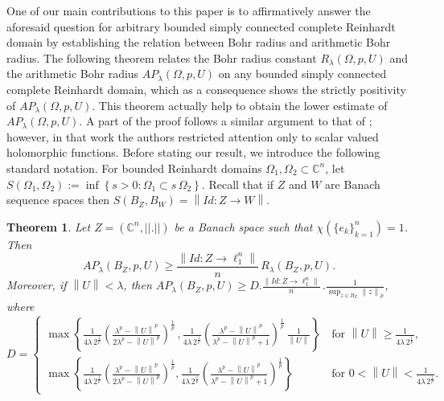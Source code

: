 \documentclass[a4paper,11pt, reqno]{amsart}
\newtheorem{thm}{Theorem}[section]
\theoremstyle{definition}
\newtheorem{qsn}{Question} [section]
\newcommand{\norm}[1]{\left\lVert#1\right\rVert}
\begin{document}
	One of our main contributions to this paper is to affirmatively answer the aforesaid question for arbitrary bounded simply connected complete Reinhardt domain by establishing the relation between Bohr radius and arithmetic Bohr radius. The following theorem relates the Bohr radius constant $R_{\lambda}(\Omega, p,U)$ and the arithmetic Bohr radius $AP_{\lambda}(\Omega, p,U)$ on any bounded  simply connected complete Reinhardt domain, which as a consequence shows the strictly positivity of $AP_{\lambda}(\Omega, p,U)$. This theorem actually help to obtain the lower estimate of $AP_{\lambda}(\Omega, p,U)$. A part of the proof follows a similar argument to that of \cite[Lemma 4.3]{defant-2012}; however, in that work the authors restricted attention only to scalar valued holomorphic functions.
	Before stating our result, we introduce the following standard notation. For bounded Reinhardt domains $\Omega_{1}, \Omega_{2}\subset \mathbb{C}^n$, let $S(\Omega_1, \Omega_{2}):= \inf \left\{s>0 : \Omega_{1} \subset s \, \Omega_{2}\right\}$. Recall that if $Z$ and $W$ are Banach sequence spaces then $S(B_{Z},B_{W})=\norm{Id:Z \rightarrow W}$.
	\begin{thm} \label{thm-1.8-atm}
			Let $Z=(\mathbb{C}^n, ||.||)$ be a Banach space such that $\chi(\{e_k\}^n_{k=1})=1$. Then 
		\begin{equation} \label{e-1.1-added}
			AP_\lambda(B_{Z},p,U) \geq \frac{\norm{Id:Z \rightarrow \ell^n_1}}{n} \, R_\lambda(B_{Z},p,U).
		\end{equation}
	Moreover, if $\norm{U}<\lambda$, then $AP_\lambda(B_{Z},p,U) \geq D.\frac{\norm{Id:Z \rightarrow \ell^n_1}}{n} \,. \frac{1}{\sup_{z \in B_{Z}}\norm{z}_{p}}$, where 
	$$
	D=\begin{cases}
		\max \left\{\frac{1}{4 \lambda\,2^{\frac{1}{p}}}\left(\frac{\lambda^p - \norm{U}^p}{2\lambda^p - \norm{U}^p}\right)^{\frac{1}{p}}\, , \frac{1}{4 \lambda\,2^{\frac{1}{p}}}\left(\frac{\lambda^p - \norm{U}^p}{\lambda^p - \norm{U}^p +1}\right)^{\frac{1}{p}}\, \frac{1}{\norm{U}}\right\}\,  & \text{for $\norm{U}\geq \frac{1}{4 \lambda\,2^{\frac{1}{p}}}$},\\[3mm]
		\max \left\{\frac{1}{4 \lambda\,2^{\frac{1}{p}}}\left(\frac{\lambda^p - \norm{U}^p}{2\lambda^p - \norm{U}^p}\right)^{\frac{1}{p}}, \frac{1}{4 \lambda\,2^{\frac{1}{p}}}\left(\frac{\lambda^p - \norm{U}^p}{\lambda^p - \norm{U}^p +1}\right)^{\frac{1}{p}}\right\} & \text{for $0<\norm{U}< \frac{1}{4 \lambda\,2^{\frac{1}{p}}}$}.
	\end{cases}
	$$
	\end{thm}
\end{document}
